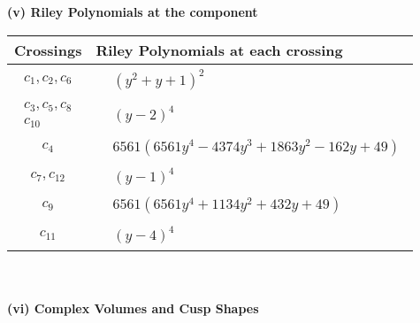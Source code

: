 \documentclass[1p]{elsarticle_modified}
\theoremstyle{definition}
\begin{document}
\newpage\renewcommand{\arraystretch}{1}
\flushleft \textbf{(v) Riley Polynomials at the component}\newline \\
\begin{tabular}{m{50pt}|m{274pt}}
Crossings & \hspace{64pt}Riley Polynomials at each crossing \\
\hline $$\begin{aligned}c_{1},c_{2},c_{6}\end{aligned}$$&$\begin{aligned}
&(y^2+y+1)^2
\end{aligned}$\\
\hline $$\begin{aligned}c_{3},c_{5},c_{8}\\c_{10}\end{aligned}$$&$\begin{aligned}
&(y-2)^4
\end{aligned}$\\
\hline $$\begin{aligned}c_{4}\end{aligned}$$&$\begin{aligned}
&6561(6561 y^4-4374 y^3+1863 y^2-162 y+49)
\end{aligned}$\\
\hline $$\begin{aligned}c_{7},c_{12}\end{aligned}$$&$\begin{aligned}
&(y-1)^4
\end{aligned}$\\
\hline $$\begin{aligned}c_{9}\end{aligned}$$&$\begin{aligned}
&6561(6561 y^4+1134 y^2+432 y+49)
\end{aligned}$\\
\hline $$\begin{aligned}c_{11}\end{aligned}$$&$\begin{aligned}
&(y-4)^4
\end{aligned}$\\
\hline
\end{tabular}\\~\\
\newpage\flushleft \textbf{(vi) Complex Volumes and Cusp Shapes}
\end{document}
